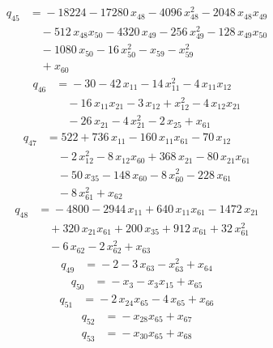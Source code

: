 \begin{align*}
q_{45} &={}-18224 -17280\,x_{48} -4096\,x_{48}^{2} -2048\,x_{48}x_{49}\\
&\quad -512\,x_{48}x_{50} -4320\,x_{49} -256\,x_{49}^{2} -128\,x_{49}x_{50}\\
&\quad -1080\,x_{50} -16\,x_{50}^{2} -x_{59} -x_{59}^{2}\\
&\quad +x_{60}
\end{align*}
\begin{align*}
q_{46} &={}-30 -42\,x_{11} -14\,x_{11}^{2} -4\,x_{11}x_{12}\\
&\quad -16\,x_{11}x_{21} -3\,x_{12} +x_{12}^{2} -4\,x_{12}x_{21}\\
&\quad -26\,x_{21} -4\,x_{21}^{2} -2\,x_{25} +x_{61}
\end{align*}
\begin{align*}
q_{47} &={}522 +736\,x_{11} -160\,x_{11}x_{61} -70\,x_{12}\\
&\quad -2\,x_{12}^{2} -8\,x_{12}x_{60} +368\,x_{21} -80\,x_{21}x_{61}\\
&\quad -50\,x_{35} -148\,x_{60} -8\,x_{60}^{2} -228\,x_{61}\\
&\quad -8\,x_{61}^{2} +x_{62}
\end{align*}
\begin{align*}
q_{48} &={}-4800 -2944\,x_{11} +640\,x_{11}x_{61} -1472\,x_{21}\\
&\quad +320\,x_{21}x_{61} +200\,x_{35} +912\,x_{61} +32\,x_{61}^{2}\\
&\quad -6\,x_{62} -2\,x_{62}^{2} +x_{63}
\end{align*}
\begin{align*}
q_{49} &={}-2 -3\,x_{63} -x_{63}^{2} +x_{64}
\end{align*}
\begin{align*}
q_{50} &={}-x_{3} -x_{3}x_{15} +x_{65}
\end{align*}
\begin{align*}
q_{51} &={}-2\,x_{24}x_{65} -4\,x_{65} +x_{66}
\end{align*}
\begin{align*}
q_{52} &={}-x_{28}x_{65} +x_{67}
\end{align*}
\begin{align*}
q_{53} &={}-x_{30}x_{65} +x_{68}
\end{align*}
